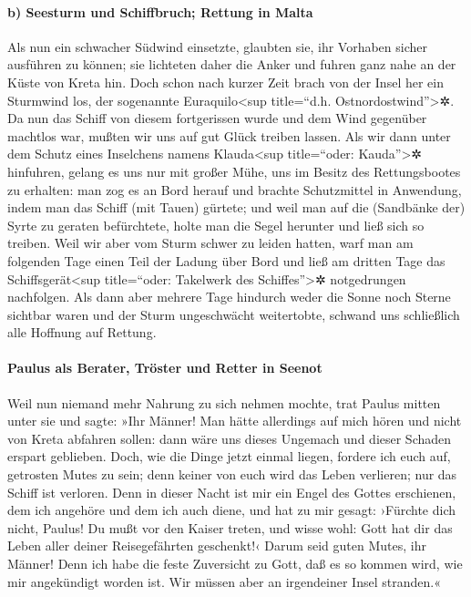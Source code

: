 \hypertarget{b-seesturm-und-schiffbruch-rettung-in-malta}{%
\paragraph{b) Seesturm und Schiffbruch; Rettung in
Malta}\label{b-seesturm-und-schiffbruch-rettung-in-malta}}

 Als nun ein schwacher Südwind einsetzte, glaubten sie,
ihr Vorhaben sicher ausführen zu können; sie lichteten daher die Anker
und fuhren ganz nahe an der Küste von Kreta hin.  Doch
schon nach kurzer Zeit brach von der Insel her ein Sturmwind los, der
sogenannte Euraquilo\textless sup title=``d.h.
Ostnordostwind''\textgreater✲.  Da nun das Schiff von
diesem fortgerissen wurde und dem Wind gegenüber machtlos war, mußten
wir uns auf gut Glück treiben lassen.  Als wir dann unter
dem Schutz eines Inselchens namens Klauda\textless sup title=``oder:
Kauda''\textgreater✲ hinfuhren, gelang es uns nur mit großer Mühe, uns
im Besitz des Rettungsbootes zu erhalten:  man zog es an
Bord herauf und brachte Schutzmittel in Anwendung, indem man das Schiff
(mit Tauen) gürtete; und weil man auf die (Sandbänke der) Syrte zu
geraten befürchtete, holte man die Segel herunter und ließ sich so
treiben.  Weil wir aber vom Sturm schwer zu leiden
hatten, warf man am folgenden Tage einen Teil der Ladung über Bord
 und ließ am dritten Tage das Schiffsgerät\textless sup
title=``oder: Takelwerk des Schiffes''\textgreater✲ notgedrungen
nachfolgen.  Als dann aber mehrere Tage hindurch weder
die Sonne noch Sterne sichtbar waren und der Sturm ungeschwächt
weitertobte, schwand uns schließlich alle Hoffnung auf Rettung.

\hypertarget{paulus-als-berater-truxf6ster-und-retter-in-seenot}{%
\paragraph{Paulus als Berater, Tröster und Retter in
Seenot}\label{paulus-als-berater-truxf6ster-und-retter-in-seenot}}

 Weil nun niemand mehr Nahrung zu sich nehmen mochte,
trat Paulus mitten unter sie und sagte: »Ihr Männer! Man hätte
allerdings auf mich hören und nicht von Kreta abfahren sollen: dann wäre
uns dieses Ungemach und dieser Schaden erspart geblieben.
 Doch, wie die Dinge jetzt einmal liegen, fordere ich
euch auf, getrosten Mutes zu sein; denn keiner von euch wird das Leben
verlieren; nur das Schiff ist verloren.  Denn in dieser
Nacht ist mir ein Engel des Gottes erschienen, dem ich angehöre und dem
ich auch diene,  und hat zu mir gesagt: ›Fürchte dich
nicht, Paulus! Du mußt vor den Kaiser treten, und wisse wohl: Gott hat
dir das Leben aller deiner Reisegefährten geschenkt!‹ 
Darum seid guten Mutes, ihr Männer! Denn ich habe die feste Zuversicht
zu Gott, daß es so kommen wird, wie mir angekündigt worden ist.
 Wir müssen aber an irgendeiner Insel stranden.«

